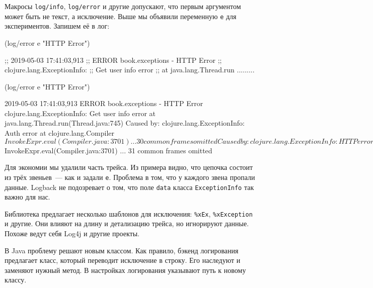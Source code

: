 \fi

\label{log-ex-param}

Макросы \verb|log/info|, \verb|log/error| и другие допускают, что первым
аргументом может быть не текст, а исключение. Выше мы объявили переменную
\verb|e| для экспериментов. Запишем её в лог:

\ifx\devicetype\mobile

\begin{english}
  \begin{clojure}
(log/error e "HTTP Error")

;; 2019-05-03 17:41:03,913
;; ERROR book.exceptions - HTTP Error
;; clojure.lang.ExceptionInfo:
;; Get user info error
;; at java.lang.Thread.run .........
  \end{clojure}
\end{english}

\else

\begin{english}
  \begin{clojure}
(log/error e "HTTP Error")

2019-05-03 17:41:03,913 ERROR book.exceptions - HTTP Error
clojure.lang.ExceptionInfo: Get user info error
    at java.lang.Thread.run(Thread.java:745)
Caused by: clojure.lang.ExceptionInfo: Auth error
    at clojure.lang.Compiler$InvokeExpr.eval(Compiler.java:3701)
    ... 30 common frames omitted
Caused by: clojure.lang.ExceptionInfo: HTTP error
    at clojure.lang.Compiler$InvokeExpr.eval(Compiler.java:3701)
    ... 31 common frames omitted
  \end{clojure}
\end{english}

\fi

Для экономии мы удалили часть трейса. Из примера видно, что цепочка состоит из
трёх звеньев~--- как и задали \verb|e|. Проблема в том, что у каждого звена
пропали данные. Logback не подозревает о том, что поле \verb|data| класса
\verb|ExceptionInfo| так важно для нас.


Библиотека предлагает несколько шаблонов для исключения: \verb|%xEx|,
\verb|%xException| и другие. Они влияют на длину и детализацию трейса, но
игнорируют данные. Похоже ведут себя Log4j и другие проекты.

В Java проблему решают новым классом. Как правило, бэкенд логирования предлагает
класс, который переводит исключение в строку. Его наследуют и заменяют нужный
метод. В настройках логирования указывают путь к новому классу.

